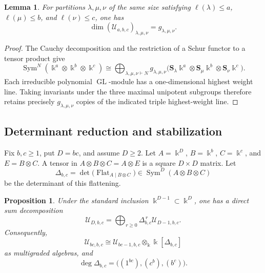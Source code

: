 \documentclass[11pt,reqno]{amsart}
\numberwithin{equation}{section}
\newtheorem{proposition}[proposition]{Proposition}
\newtheorem{lemma}[lemma]{Lemma}
\theoremstyle{remark}
\newcommand{\kk}{\Bbbk}
\newcommand{\UR}{\mathscr U}
\newcommand{\Sym}{\operatorname{Sym}}
\newcommand{\GL}{\operatorname{GL}}
\newcommand{\Schur}{\mathbf{S}}
\begin{document}
\begin{lemma}
\label{lem:kronecker-weight-space}
For partitions $\lambda,\mu,\nu$ of the same size satisfying
$\ell(\lambda)\le a$, $\ell(\mu)\le b$, and $\ell(\nu)\le c$, one has
\[ \dim (\UR_{a,b,c})_{\lambda,\mu,\nu} =g_{\lambda,\mu,\nu}. \]
\end{lemma}

\begin{proof}
The Cauchy decomposition and the restriction of a Schur functor to a tensor
product give
\[
 \Sym^N(\kk^a\otimes\kk^b\otimes\kk^c)
 \cong
 \bigoplus_{\lambda,\mu,\nu\vdash N}
 g_{\lambda,\mu,\nu}
 \bigl(\Schur_\lambda\kk^a\otimes
       \Schur_\mu\kk^b\otimes
       \Schur_\nu\kk^c\bigr).
\]
Each irreducible polynomial $\GL$-module has a one-dimensional highest
weight line.  Taking invariants under the three maximal unipotent subgroups
therefore retains precisely $g_{\lambda,\mu,\nu}$ copies of the indicated
triple highest-weight line.
\end{proof}

\subsection{Determinant reduction and stabilization}

Fix $b,c\ge1$, put $D=bc$, and assume $D\ge2$.  Let
$A=\kk^D$, $B=\kk^b$, $C=\kk^c$, and $E=B\otimes C$.  A tensor in
$A\otimes B\otimes C=A\otimes E$ is a square $D\times D$ matrix.  Let
\[ \Delta_{b,c} =\det\bigl(\operatorname{Flat}_{A\mid B\otimes C}\bigr) \in\Sym^D(A\otimes B\otimes C) \]
be the determinant of this flattening.

\begin{proposition}
\label{prop:det-extension}
Under the standard inclusion $\kk^{D-1}\subset\kk^D$, one has a direct
sum decomposition
\[ \UR_{D,b,c} =\bigoplus_{r\ge0}\Delta_{b,c}^{\,r}\UR_{D-1,b,c}. \]
Consequently,
\[ \UR_{bc,b,c}\cong\UR_{bc-1,b,c}\otimes_\kk\kk[\Delta_{b,c}] \]
as multigraded algebras, and
\[ \deg\Delta_{b,c} =\bigl((1^{bc}),(c^b),(b^c)\bigr). \]
\end{proposition}
\end{document}
